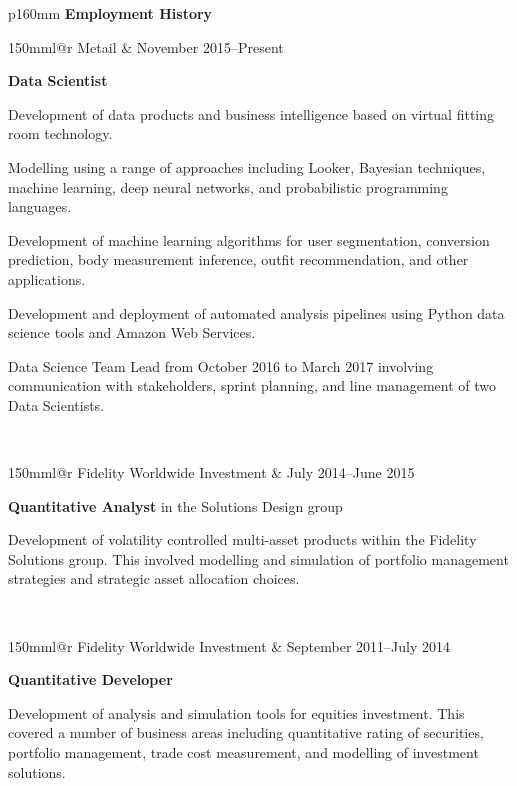 \documentclass[10pt,a4paper]{article}
\makeatletter
\newcommand{\role}[6]{
\begin{tabular*}{150mm}{l@{\extracolsep{\fill}}r}
#5 & #1--#2 \\ 
\multicolumn{2}{p{145mm}}
{\textbf{#3}#4

#6} 
\end{tabular*}
\vspace{2mm}
 }
\makeatother
\begin{document}
\begin{tabular}{p{160mm}}
  {\large \textbf{Employment History}}\\
  \hline
  \role{November 2015}{Present}{Data Scientist}{}{Metail} 
  {Development of data products and business intelligence based on virtual fitting room technology.

   Modelling using a range of approaches including Looker, Bayesian techniques, 
   machine learning, deep neural networks, and probabilistic programming languages.

   Development of machine learning algorithms for user segmentation,
   conversion prediction, body measurement inference, outfit recommendation, and other applications.

   Development and deployment of automated analysis pipelines using Python data science tools
   and Amazon Web Services.

   Data Science Team Lead from October 2016 to
   March 2017 involving communication with stakeholders, sprint planning, 
   and line management of two Data Scientists.
  }\\
  \role{July 2014}{June 2015}{Quantitative Analyst}{ in the Solutions Design
  group}{Fidelity Worldwide Investment}
  {Development of volatility controlled multi-asset products 
  within the Fidelity Solutions group. This
  involved modelling and simulation of portfolio management
  strategies and strategic asset allocation choices.}\\
  \role{September 2011}{July 2014}{Quantitative Developer}{}
    {Fidelity Worldwide Investment}
    {Development of analysis and simulation tools for equities investment. This
    covered a number of business areas including quantitative rating of
    securities, portfolio management, trade cost measurement, and
    modelling of investment solutions.

}
\end{tabular}
\end{document}
